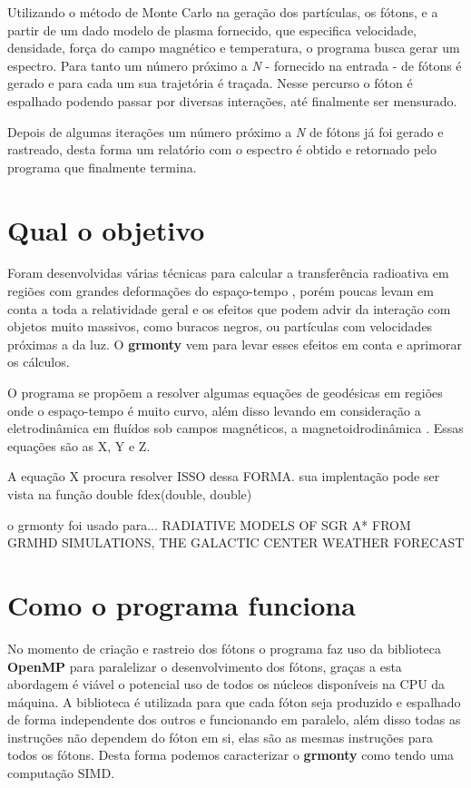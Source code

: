   Utilizando o método de Monte Carlo na geração dos partículas, os fótons, e a partir de um dado modelo de plasma fornecido, que especifica velocidade, densidade, força do campo magnético e temperatura, o programa busca gerar um espectro. Para tanto um número próximo a \textit{N} - fornecido na entrada - de fótons é gerado e para cada um sua trajetória é traçada. Nesse percurso o fóton é espalhado podendo passar por diversas interações, até finalmente ser mensurado.

  Depois de algumas iterações um número próximo a \textit{N} de fótons já foi gerado e rastreado, desta forma um relatório com o espectro é obtido e retornado pelo programa que finalmente termina.

\section{Qual o objetivo}
  Foram desenvolvidas várias técnicas para calcular a transferência radioativa em regiões com grandes deformações do espaço-tempo \citep{Dolence:09}, porém poucas levam em conta a toda a relatividade geral e os efeitos que podem advir da interação com objetos muito massivos, como buracos negros, ou partículas com velocidades próximas a da luz. O \textbf{grmonty} vem para levar esses efeitos em conta e aprimorar os cálculos.

  O programa se propõem a resolver algumas equações de geodésicas em regiões onde o espaço-tempo é muito curvo, além disso levando em consideração a eletrodinâmica em fluídos sob campos magnéticos, a magnetoidrodinâmica \cite{eletro-hidro-dynamic:42}. Essas equações são as X, Y e Z.

  A equação X procura resolver ISSO dessa FORMA. sua implentação pode ser vista na função double fdex(double, double)

  o grmonty foi usado para... RADIATIVE MODELS OF SGR A* FROM GRMHD SIMULATIONS, THE GALACTIC CENTER WEATHER FORECAST

\section{Como o programa funciona}
\label{sec:comofaz}

  No momento de criação e rastreio dos fótons o programa faz uso da biblioteca \textbf{OpenMP} para paralelizar o desenvolvimento dos fótons, graças a esta abordagem é viável o potencial uso de todos os núcleos disponíveis na CPU da máquina. A biblioteca é utilizada para que cada fóton seja produzido e espalhado de forma independente dos outros e funcionando em paralelo, além disso todas as instruções não dependem do fóton em si, elas são as mesmas instruções para todos os fótons. Desta forma podemos caracterizar o \textbf{grmonty} como tendo uma computação SIMD.

